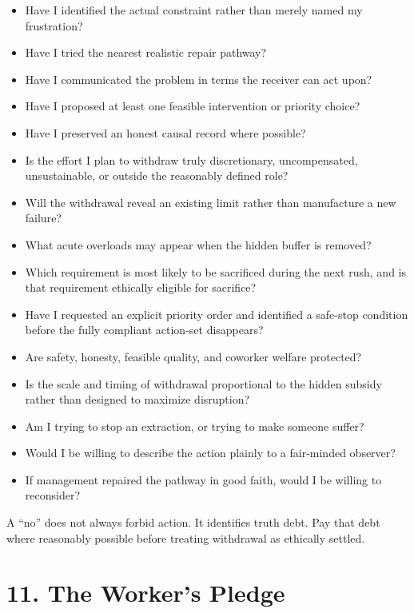 \documentclass[11pt,oneside]{article}
\providecommand{\tightlist}{%
  \setlength{\itemsep}{0.22em}\setlength{\parskip}{0pt}}
\begin{document}
\begin{itemize}
\tightlist
\item
  Have I identified the actual constraint rather than merely named my
  frustration?
\item
  Have I tried the nearest realistic repair pathway?
\item
  Have I communicated the problem in terms the receiver can act upon?
\item
  Have I proposed at least one feasible intervention or priority choice?
\item
  Have I preserved an honest causal record where possible?
\item
  Is the effort I plan to withdraw truly discretionary, uncompensated,
  unsustainable, or outside the reasonably defined role?
\item
  Will the withdrawal reveal an existing limit rather than manufacture a
  new failure?
\item
  What acute overloads may appear when the hidden buffer is removed?
\item
  Which requirement is most likely to be sacrificed during the next
  rush, and is that requirement ethically eligible for sacrifice?
\item
  Have I requested an explicit priority order and identified a safe-stop
  condition before the fully compliant action-set disappears?
\item
  Are safety, honesty, feasible quality, and coworker welfare protected?
\item
  Is the scale and timing of withdrawal proportional to the hidden
  subsidy rather than designed to maximize disruption?
\item
  Am I trying to stop an extraction, or trying to make someone suffer?
\item
  Would I be willing to describe the action plainly to a fair-minded
  observer?
\item
  If management repaired the pathway in good faith, would I be willing
  to reconsider?
\end{itemize}

A ``no'' does not always forbid action. It identifies truth debt. Pay
that debt where reasonably possible before treating withdrawal as
ethically settled.

\section{11. The Worker's Pledge}\label{the-workers-pledge}
\end{document}
